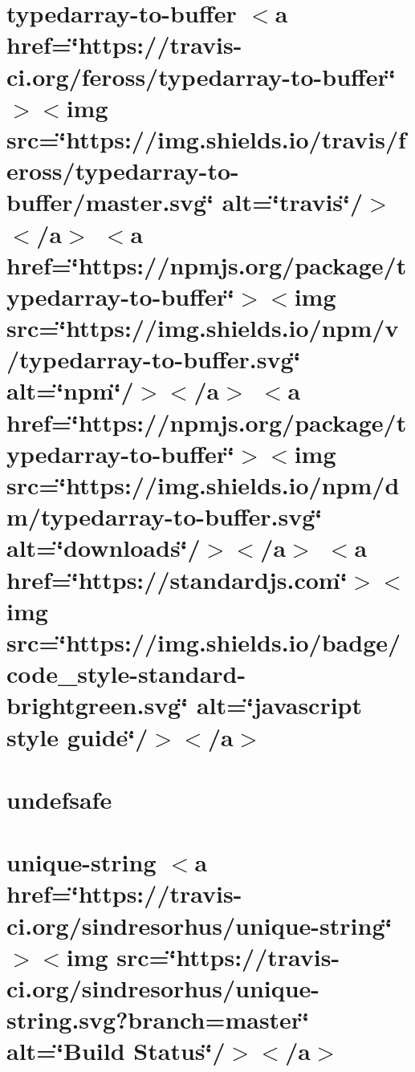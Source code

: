 \let\mypdfximage\pdfximage\def\pdfximage{\immediate\mypdfximage}\documentclass[twoside]{book}
\newcommand{\+}{\discretionary{\mbox{\scriptsize$\hookleftarrow$}}{}{}}
\begin{document}
\chapter{typedarray-\/to-\/buffer $<$a href=\char`\"{}https\+://travis-\/ci.\+org/feross/typedarray-\/to-\/buffer\char`\"{}$>$$<$img src=\char`\"{}https\+://img.\+shields.\+io/travis/feross/typedarray-\/to-\/buffer/master.\+svg\char`\"{} alt=\char`\"{}travis\char`\"{}/$>$$<$/a$>$ $<$a href=\char`\"{}https\+://npmjs.\+org/package/typedarray-\/to-\/buffer\char`\"{}$>$$<$img src=\char`\"{}https\+://img.\+shields.\+io/npm/v/typedarray-\/to-\/buffer.\+svg\char`\"{} alt=\char`\"{}npm\char`\"{}/$>$$<$/a$>$ $<$a href=\char`\"{}https\+://npmjs.\+org/package/typedarray-\/to-\/buffer\char`\"{}$>$$<$img src=\char`\"{}https\+://img.\+shields.\+io/npm/dm/typedarray-\/to-\/buffer.\+svg\char`\"{} alt=\char`\"{}downloads\char`\"{}/$>$$<$/a$>$ $<$a href=\char`\"{}https\+://standardjs.\+com\char`\"{}$>$$<$img src=\char`\"{}https\+://img.\+shields.\+io/badge/code\+\_\+style-\/standard-\/brightgreen.\+svg\char`\"{} alt=\char`\"{}javascript style guide\char`\"{}/$>$$<$/a$>$}
\label{md__c_1__git_hub__p_r_o_y_e_c_t_o-_i_i_i-_g_o_t_rest-api-node-mysql_node_modules_typedarray-to-buffer__r_e_a_d_m_e}

\chapter{undefsafe}
\label{md__c_1__git_hub__p_r_o_y_e_c_t_o-_i_i_i-_g_o_t_rest-api-node-mysql_node_modules_undefsafe__r_e_a_d_m_e}

\chapter{unique-\/string $<$a href=\char`\"{}https\+://travis-\/ci.\+org/sindresorhus/unique-\/string\char`\"{}$>$$<$img src=\char`\"{}https\+://travis-\/ci.\+org/sindresorhus/unique-\/string.\+svg?branch=master\char`\"{} alt=\char`\"{}\+Build Status\char`\"{}/$>$$<$/a$>$}
\label{md__c_1__git_hub__p_r_o_y_e_c_t_o-_i_i_i-_g_o_t_rest-api-node-mysql_node_modules_unique-string_readme}

\end{document}
